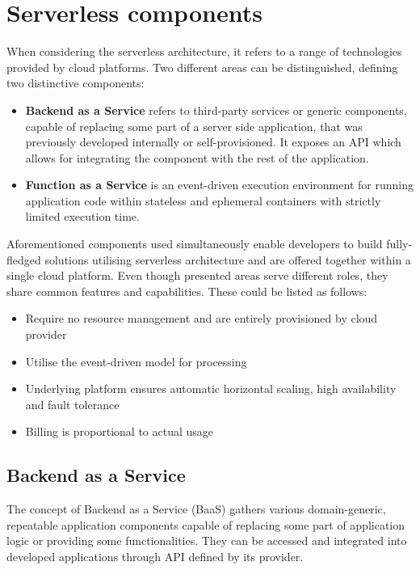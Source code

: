 \section{Serverless components} \label{section:serverless-components}

When considering the serverless architecture, it refers to a range of technologies provided by cloud platforms. Two different areas can be distinguished, defining two distinctive components:

\begin{itemize}
    \item \textbf{Backend as a Service} refers to third-party services or generic components, capable of replacing some part of a server side application, that was previously developed internally or self-provisioned. It exposes an API which allows for integrating the component with the rest of the application.
    \item \textbf{Function as a Service} is an event-driven execution environment for running application code within stateless and ephemeral containers with strictly limited execution time.
\end{itemize}

Aforementioned components used simultaneously enable developers to build fully-fledged solutions utilising serverless architecture and are offered together within a single cloud platform.
Even though presented areas serve different roles, they share common features and capabilities. These could be listed as follows:

\begin{itemize}
    \item Require no resource management and are entirely provisioned by cloud provider
    \item Utilise the event-driven model for processing
    \item Underlying platform ensures automatic horizontal scaling, high availability and fault tolerance
    \item Billing is proportional to actual usage
\end{itemize}

\subsection{Backend as a Service}

The concept of Backend as a Service (BaaS) gathers various domain-generic, repeatable application components capable of replacing some part of application logic or providing some functionalities. They can be accessed and integrated into developed applications through API defined by its provider.

